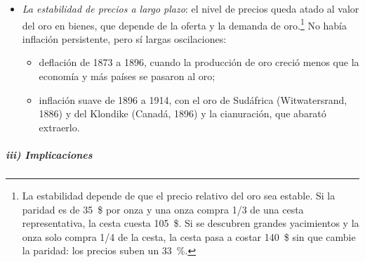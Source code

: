 \documentclass[11pt]{article}
\begin{document}
\begin{itemize}
\item \emph{La estabilidad de precios a largo plazo}: el nivel de precios queda atado al valor del oro en bienes, que depende de la oferta y la demanda de oro.\footnote{La estabilidad depende de que el precio relativo del oro sea estable. Si la paridad es de 35~\$ por onza y una onza compra 1/3 de una cesta representativa, la cesta cuesta 105~\$. Si se descubren grandes yacimientos y la onza solo compra 1/4 de la cesta, la cesta pasa a costar 140~\$ sin que cambie la paridad: los precios suben un 33~\%.} No había inflación persistente, pero sí largas oscilaciones:
  \begin{itemize}
  \item deflación de 1873 a 1896, cuando la producción de oro creció menos que la economía y más países se pasaron al oro;
  \item inflación suave de 1896 a 1914, con el oro de Sudáfrica (Witwatersrand, 1886) y del Klondike (Canadá, 1896) y la cianuración, que abarató extraerlo.
  \end{itemize}
\end{itemize}


\subparagraph{iii) Implicaciones}
\end{document}
